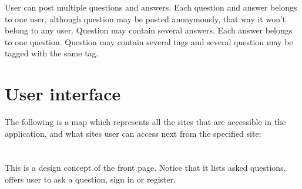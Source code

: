 \documentclass[a4paper,12pt]{article}
\begin{document}
User can post multiple questions and answers. Each question and answer belongs to one user, although question may be posted anonymously, that way it won't belong to any user. Question may contain several answers. Each answer belongs to one question. Question may contain several tags and several question may be tagged with the same tag.
\newpage

\section{User interface}
The following is a map which represents all the sites that are accessible in the application, and what sites user can access next from the specified site:\\
\\
\\
This is a design concept of the front page. Notice that it lists asked questions, offers user to ask a question, sign in or register.\\
\\
\end{document}
